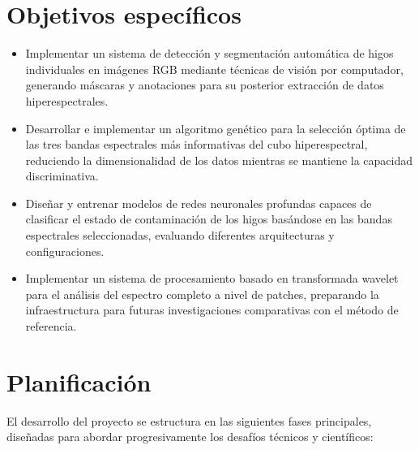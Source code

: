 \section{Objetivos específicos}
\begin{itemize}
    \item Implementar un sistema de detección y segmentación automática de higos individuales en imágenes RGB mediante técnicas de visión por computador, generando máscaras y anotaciones para su posterior extracción de datos hiperespectrales.
    \item Desarrollar e implementar un algoritmo genético para la selección óptima de las tres bandas espectrales más informativas del cubo hiperespectral, reduciendo la dimensionalidad de los datos mientras se mantiene la capacidad discriminativa.
    \item Diseñar y entrenar modelos de redes neuronales profundas capaces de clasificar el estado de contaminación de los higos basándose en las bandas espectrales seleccionadas, evaluando diferentes arquitecturas y configuraciones.
    \item Implementar un sistema de procesamiento basado en transformada wavelet para el análisis del espectro completo a nivel de patches, preparando la infraestructura para futuras investigaciones comparativas con el método de referencia.
\end{itemize}

\newpage
\section{Planificación}
El desarrollo del proyecto se estructura en las siguientes fases principales, diseñadas para abordar progresivamente los desafíos técnicos y científicos:

